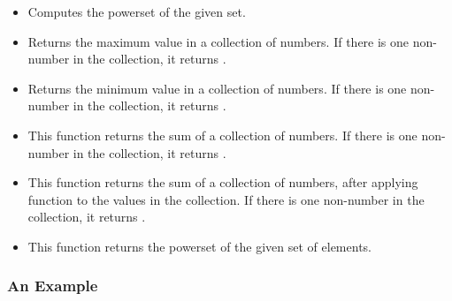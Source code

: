 \documentclass{article}
\begin{document}
\begin{itemize}

\item {\bf {} }  Computes the powerset of the given set. 

\item {\bf {} }  Returns the maximum value in a collection of numbers. 
	If there is one non-number in the collection, it returns \Rundef.


\item {\bf {} }  Returns the minimum value in a collection of numbers.
	If there is one non-number in the collection, it returns \Rundef.


\item {\bf {} }   This function returns the sum of a collection of numbers. 
	If there is one non-number in the collection, it returns \Rundef.

\item {\bf {} }   This function returns the sum of a collection of numbers, 
	after applying function {\bf {}} to the values in the collection. If there is one non-number 
	in the collection, it returns \Rundef.

\item {\bf {} } This function returns the powerset of the given set of elements.

\end{itemize}

\subsubsection{An Example}
\end{document}
